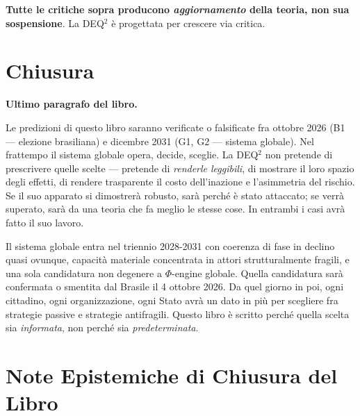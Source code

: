 \Proved{} \textbf{Tutte le critiche sopra producono \emph{aggiornamento}
della teoria, non sua sospensione}. La DEQ$^2$ è progettata per crescere
via critica.



\section{Chiusura}\label{chiusura}

\Hypoth{} \textbf{Ultimo paragrafo del libro.}

Le predizioni di questo libro saranno verificate o falsificate fra
ottobre 2026 (B1 --- elezione brasiliana) e dicembre 2031 (G1, G2 ---
sistema globale). Nel frattempo il sistema globale opera, decide,
sceglie. La DEQ$^2$ non pretende di prescrivere quelle scelte --- pretende
di \emph{renderle leggibili}, di mostrare il loro spazio degli effetti,
di rendere trasparente il costo dell'inazione e l'asimmetria del
rischio. Se il suo apparato si dimostrerà robusto, sarà perché è stato
attaccato; se verrà superato, sarà da una teoria che fa meglio le stesse
cose. In entrambi i casi avrà fatto il suo lavoro.

Il sistema globale entra nel triennio 2028-2031 con coerenza di fase in
declino quasi ovunque, capacità materiale concentrata in attori
strutturalmente fragili, e una sola candidatura non degenere a
\(\Phi\)-engine globale. Quella candidatura sarà confermata o smentita
dal Brasile il 4 ottobre 2026. Da quel giorno in poi, ogni cittadino,
ogni organizzazione, ogni Stato avrà un dato in più per scegliere fra
strategie passive e strategie antifragili. Questo libro è scritto perché
quella scelta sia \emph{informata}, non perché sia
\emph{predeterminata}.



\section{Note Epistemiche di Chiusura del
Libro}\label{note-epistemiche-di-chiusura-del-libro}

